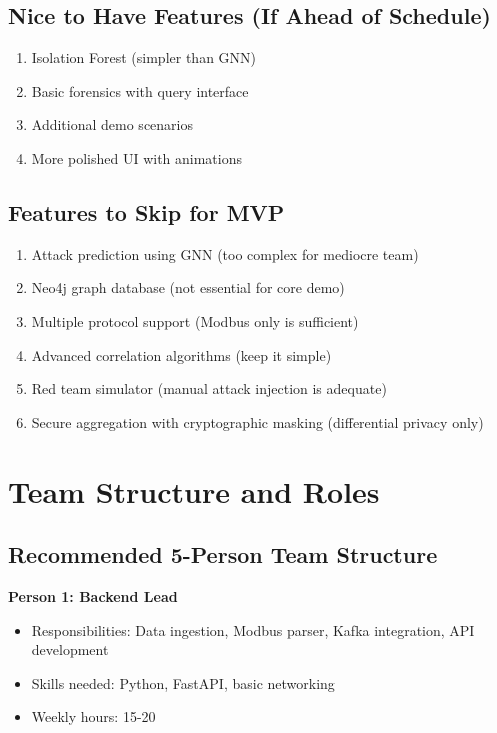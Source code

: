 \documentclass[12pt,a4paper]{article}
\begin{document}
\subsection{Nice to Have Features (If Ahead of Schedule)}

\begin{enumerate}[leftmargin=1cm,itemsep=0pt]
    \item Isolation Forest (simpler than GNN)
    \item Basic forensics with query interface
    \item Additional demo scenarios
    \item More polished UI with animations
\end{enumerate}

\subsection{Features to Skip for MVP}

\begin{enumerate}[leftmargin=1cm,itemsep=0pt]
    \item Attack prediction using GNN (too complex for mediocre team)
    \item Neo4j graph database (not essential for core demo)
    \item Multiple protocol support (Modbus only is sufficient)
    \item Advanced correlation algorithms (keep it simple)
    \item Red team simulator (manual attack injection is adequate)
    \item Secure aggregation with cryptographic masking (differential privacy only)
\end{enumerate}

\section{Team Structure and Roles}

\subsection{Recommended 5-Person Team Structure}

\textbf{Person 1: Backend Lead}
\begin{itemize}[leftmargin=1cm,itemsep=0pt]
    \item Responsibilities: Data ingestion, Modbus parser, Kafka integration, API development
    \item Skills needed: Python, FastAPI, basic networking
    \item Weekly hours: 15-20
\end{itemize}
\end{document}
